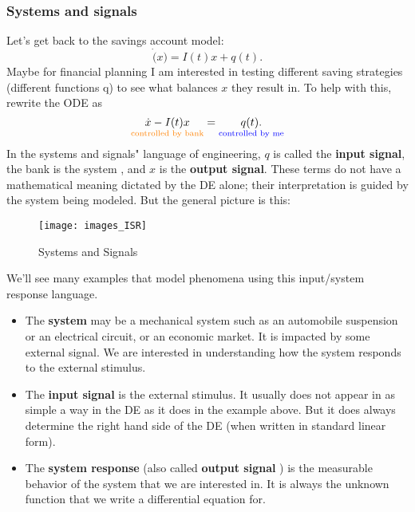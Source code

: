 \subsubsection{Systems and signals}
Let's get back to the savings account model:
\begin{equation*}
  \displaystyle \dot(x) = I(t)x + q(t). 
\end{equation*}
Maybe for financial planning I am interested in testing different saving strategies (different functions q) to see what balances $x$ they result in.
To help with this, rewrite the ODE as
\begin{equation*}
  \underset {{\color{orange}{\text {controlled by bank}}} }{\dot{x} - I(t) x} =
  \underset {{\color{blue}{\text {controlled by me}}} }{q(t).}
\end{equation*}
In the systems and signals" language of engineering, $q$ is called the \textbf{input signal},
the bank is the system , and $x$ is the \textbf{output signal}.
These terms do not have a mathematical meaning dictated by the DE alone;
their interpretation is guided by the system being modeled. But the general picture is this:
\begin{figure}[ht!]
  \centering
  \texttt{[image: images\_ISR]}
  \caption{Systems and Signals}
  \label{fig:SIR}
\end{figure}
We'll see many examples that model phenomena using this input/system response language.
\begin{itemize}
\item The \textbf{system} may be a mechanical system such as an automobile suspension or an electrical circuit, or an economic market.  It is impacted by some external signal.
  We are interested in understanding how the system responds to the external stimulus.
\item The \textbf{\color{blue} input signal} is the external stimulus.
  It usually does not appear in as simple a way in the DE as it does in the example above.
  But it does always determine the right hand side of the DE (when written in standard linear form).
\item The \textbf{\color{orange} system response} (also called \textbf{\color{orange} output signal} ) is the measurable behavior of the system that we are interested in.
  It is always the unknown function that we write a differential equation for.
\end{itemize}
\clearpage

